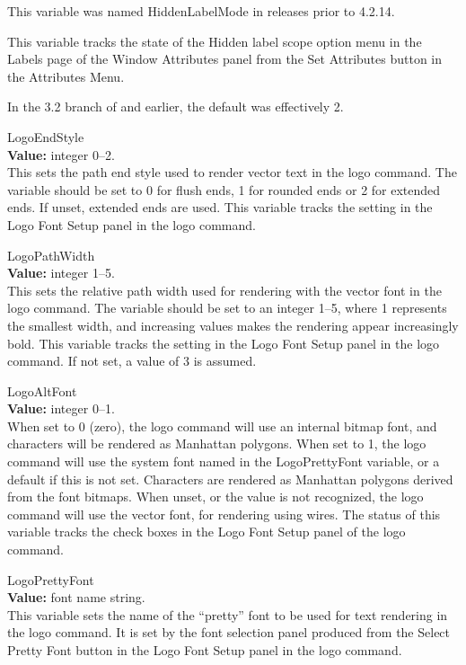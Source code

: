 \begin{description}
This variable was named {\et HiddenLabelMode} in releases prior to
4.2.14.

This variable tracks the state of the {\cb Hidden label scope} option
menu in the {\cb Labels} page of the {\cb Window Attributes} panel
from the {\cb Set Attributes} button in the {\cb Attributes Menu}.

In the 3.2 branch of {\Xic} and earlier, the default was effectively
2.

\item{\et LogoEndStyle}\\
{\bf Value:} integer 0--2.\\
This sets the path end style used to render vector text in the {\cb
logo} command.  The variable should be set to 0 for flush ends, 1 for
rounded ends or 2 for extended ends.  If unset, extended ends are
used.  This variable tracks the setting in the {\cb Logo Font Setup}
panel in the {\cb logo} command.

\item{\et LogoPathWidth}\\
{\bf Value:} integer 1--5.\\
This sets the relative path width used for rendering with the vector
font in the {\cb logo} command.  The variable should be set to an
integer 1--5, where 1 represents the smallest width, and increasing
values makes the rendering appear increasingly bold.  This variable
tracks the setting in the {\cb Logo Font Setup} panel in the {\cb
logo} command.  If not set, a value of 3 is assumed.

\item{\et LogoAltFont}\\
{\bf Value:} integer 0--1.\\
When set to 0 (zero), the {\cb logo} command will use an internal
bitmap font, and characters will be rendered as Manhattan polygons. 
When set to 1, the {\cb logo} command will use the system font named
in the {\et LogoPrettyFont} variable, or a default if this is not set. 
Characters are rendered as Manhattan polygons derived from the font
bitmaps.  When unset, or the value is not recognized, the {\cb logo}
command will use the vector font, for rendering using wires.  The
status of this variable tracks the check boxes in the {\cb Logo Font
Setup} panel of the {\cb logo} command.

\item{\et LogoPrettyFont}\\
{\bf Value:} font name string.\\
This variable sets the name of the ``pretty'' font to be used for text
rendering in the {\cb logo} command.  It is set by the font selection
panel produced from the {\cb Select Pretty Font} button in the {\cb
Logo Font Setup} panel in the {\cb logo} command.


\end{description}
